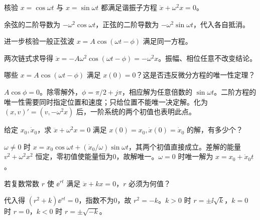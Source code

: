 \begin{exercise}\label{cw:rec07-1}
核验 $x=\cos\omega t$ 与 $x=\sin\omega t$ 都满足谐振子方程 $\ddot x+\omega^2x=0$。
\end{exercise}
\begin{solution}
余弦的二阶导数为 $-\omega^2\cos\omega t$，正弦的二阶导数为 $-\omega^2\sin\omega t$，代入各自抵消。
\par{}
\end{solution}

\begin{exercise}\label{cw:rec07-2}
进一步核验一般正弦波 $x=A\cos(\omega t-\phi)$ 满足同一方程。
\end{exercise}
\begin{solution}
两次链式求导得 $\ddot x=-A\omega^2\cos(\omega t-\phi)=-\omega^2x$。振幅、相位任意不改变结论。
\par{}
\end{solution}

\begin{exercise}\label{cw:rec07-3}
哪些 $x=A\cos(\omega t-\phi)$ 满足 $x(0)=0$？这是否违反微分方程的唯一性定理？
\end{exercise}
\begin{solution}
$A\cos\phi=0$。除零解外，$\phi=\pi/2+j\pi$，相应解为任意倍数的 $\sin\omega t$。二阶方程的唯一性需要同时指定位置和速度；只给位置不能唯一决定解。化为 $(x,v)'=(v,-\omega^2x)$ 后，一阶系统的两个初值也表明此点。
\par{}
\end{solution}

\begin{exercise}\label{cw:rec07-4}
给定 $x_0,\dot x_0$，求 $\ddot x+\omega^2x=0$ 满足 $x(0)=x_0,\dot x(0)=\dot x_0$ 的解，有多少个？
\end{exercise}
\begin{solution}
$\omega\ne0$ 时 $x=x_0\cos\omega t+(\dot x_0/\omega)\sin\omega t$，其两个初值直接成立。差解的能量 $v^2+\omega^2x^2$ 恒定，零初值使能量恒为0，故解唯一。$\omega=0$ 时唯一解为 $x=x_0+\dot x_0t$。
\par{}
\end{solution}

\begin{exercise}\label{cw:rec07-5}
若复数常数 $r$ 使 $\ee^{rt}$ 满足 $\ddot x+kx=0$，$r$ 必须为何值？
\end{exercise}
\begin{solution}
代入得 $(r^2+k)\ee^{rt}=0$，指数不为0，故 $r^2=-k$。$k>0$ 时 $r=\pm\ii\sqrt k$，$k=0$ 时 $r=0$，$k<0$ 时 $r=\pm\sqrt{-k}$。
\par{}
\end{solution}

